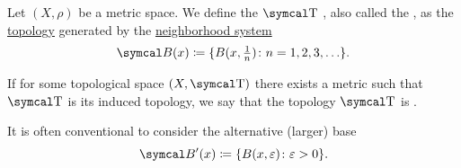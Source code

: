 \begin{definition}\label{def:metric_topology}
  Let \( (X, \rho) \) be a metric space. We define the \( \CT \) , also called the , as the \hyperref[def:topological_space]{topology} generated by the \hyperref[def:topological_local_base]{neighborhood system}
  \begin{equation}\label{def:metric_topology/integer_base}
    \Cal{B}(x) \coloneqq \{ B(x, \tfrac 1 n) \colon n = 1, 2, 3, \ldots \}.
  \end{equation}

  If for some topological space \( (X, \CT) \) there exists a metric such that \( \CT \) is its induced topology, we say that the topology \( \CT \) is .

  It is often conventional to consider the alternative (larger) base
  \begin{equation}\label{def:metric_topology/real_base}
    \Cal{B}'(x) \coloneqq \{ B(x, \varepsilon) \colon \varepsilon > 0 \}.
  \end{equation}
\end{definition}
